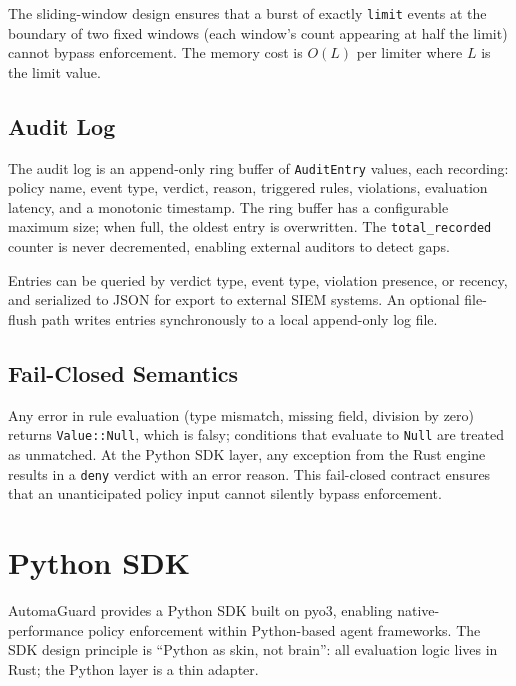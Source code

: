 \documentclass[sigconf]{acmart}
\begin{document}
The sliding-window design ensures that a burst of exactly \texttt{limit}
events at the boundary of two fixed windows (each window's count appearing
at half the limit) cannot bypass enforcement. The memory cost is $O(L)$ per
limiter where $L$ is the limit value.

\subsection{Audit Log}

The audit log is an append-only ring buffer of \texttt{AuditEntry} values,
each recording: policy name, event type, verdict, reason, triggered rules,
violations, evaluation latency, and a monotonic timestamp. The ring buffer
has a configurable maximum size; when full, the oldest entry is overwritten.
The \texttt{total\_recorded} counter is never decremented, enabling external
auditors to detect gaps.

Entries can be queried by verdict type, event type, violation presence, or
recency, and serialized to JSON for export to external SIEM systems. An
optional file-flush path writes entries synchronously to a local append-only
log file.

\subsection{Fail-Closed Semantics}

Any error in rule evaluation (type mismatch, missing field, division by zero)
returns \texttt{Value::Null}, which is falsy; conditions that evaluate to
\texttt{Null} are treated as unmatched. At the Python SDK layer, any exception
from the Rust engine results in a \texttt{deny} verdict with an error reason.
This fail-closed contract ensures that an unanticipated policy input cannot
silently bypass enforcement.


\section{Python SDK}
\label{sec:sdk}

AutomaGuard provides a Python SDK built on pyo3, enabling native-performance
policy enforcement within Python-based agent frameworks. The SDK design
principle is ``Python as skin, not brain'': all evaluation logic lives in
Rust; the Python layer is a thin adapter.
\end{document}
